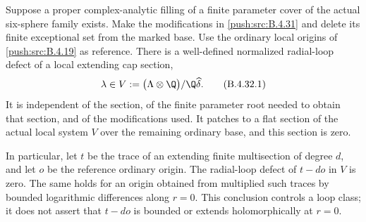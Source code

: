\begin{proposition}\label{push:src:B.4.32}
\label{push:B432}
Suppose a proper complex-analytic filling of a finite parameter
cover of the actual six-sphere family exists. Make the
modifications in \ref{push:src:B.4.31} and delete its finite exceptional set
from the marked base. Use the ordinary local origins of
\ref{push:src:B.4.19} as reference. There is a well-defined normalized
radial-loop defect of a local extending cap section,
\[
 \lambda\in
 V:=\bigl(\Lambda\otimes\Q\bigr)/\Q\widehat\delta .
 \tag{B.4.32.1}
\]
It is independent of the section, of the finite parameter root
needed to obtain that section, and of the modifications used.
It patches to a flat section of the actual local system $V$
over the remaining ordinary base, and this section is zero.

In particular, let $t$ be the trace of an extending finite
multisection of degree $d$, and let $o$ be the reference ordinary
origin. The radial-loop defect of $t-do$ in $V$ is zero.
The same holds for an origin obtained from multiplied such
traces by bounded logarithmic differences along $r=0$.
This conclusion controls a loop class; it does not assert
that $t-do$ is bounded or extends holomorphically at $r=0$.
\end{proposition}


